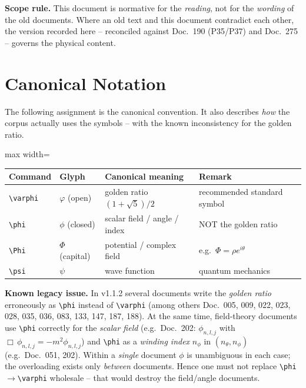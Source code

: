 \begin{important}
\textbf{Scope rule.} This document is normative for the \emph{reading}, not for
the \emph{wording} of the old documents. Where an old text and this document
contradict each other, the version recorded here -- reconciled against
Doc.~190 (P35/P37) and Doc.~275 -- governs the physical content.
\end{important}

\section{Canonical Notation}

The following assignment is the canonical convention. It also describes
\emph{how} the corpus actually uses the symbols -- with the known
inconsistency for the golden ratio.

\begin{center}
\begin{adjustbox}{max width=\textwidth}
\begin{tabular}{l l l l}
\hline
\textbf{Command} & \textbf{Glyph} & \textbf{Canonical meaning} & \textbf{Remark} \\
\hline
\verb|\varphi| & $\varphi$ (open) & golden ratio $(1+\sqrt5)/2$ & recommended standard symbol \\
\verb|\phi|    & $\phi$ (closed) & scalar field / angle / index & NOT the golden ratio \\
\verb|\Phi|    & $\Phi$ (capital) & potential / complex field & e.g.\ $\Phi=\rho e^{i\theta}$ \\
\verb|\psi|    & $\psi$ & wave function & quantum mechanics \\
\hline
\end{tabular}
\end{adjustbox}
\end{center}

\begin{caution}
\textbf{Known legacy issue.} In v1.1.2 several documents write the
\emph{golden ratio} erroneously as \verb|\phi| instead of \verb|\varphi|
(among others Doc.~005, 009, 022, 023, 028, 035, 036, 083, 133, 147, 187,
188). At the same time, field-theory documents use \verb|\phi| correctly for
the \emph{scalar field} (e.g.\ Doc.~202: $\phi_{n,l,j}$ with
$\Box\,\phi_{n,l,j}=-m^2\phi_{n,l,j}$) and \verb|\phi| as a
\emph{winding index} $n_\phi$ in $(n_\theta,n_\phi)$ (e.g.\ Doc.~051, 202).
Within a \emph{single} document $\phi$ is unambiguous in each case; the
overloading exists only \emph{between} documents. Hence one must not replace
\verb|\phi|$\to$\verb|\varphi| wholesale -- that would destroy the
field/angle documents.
\end{caution}

